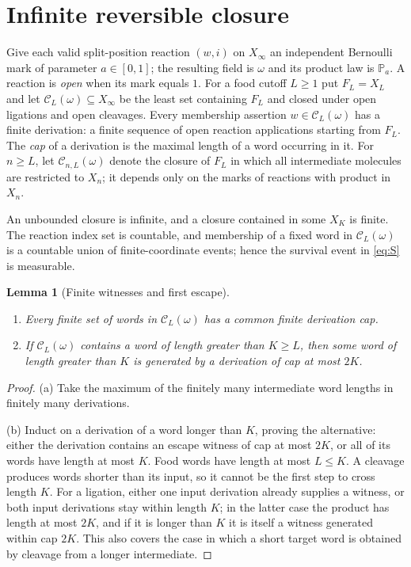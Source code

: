 \documentclass[11pt,reqno]{amsart}
\theoremstyle{plain}
\newtheorem{lemma}[theorem]{Lemma}
\theoremstyle{definition}
\theoremstyle{remark}
\numberwithin{equation}{section}
\newcommand{\Prob}{\mathbb{P}}
\newcommand{\cC}{\mathcal{C}}
\newcommand{\Xinf}{X_\infty}
\begin{document}
\section{Infinite reversible closure}\label{sec:infinite}

Give each valid split-position reaction $(w,i)$ on $\Xinf$ an independent Bernoulli mark of parameter $a\in[0,1]$; the resulting field is $\omega$ and its product law is $\Prob_a$. A reaction is \emph{open} when its mark equals $1$. For a food cutoff $L\ge1$ put $F_L=X_L$ and let $\cC_L(\omega)\subseteq\Xinf$ be the least set containing $F_L$ and closed under open ligations and open cleavages. Every membership assertion $w\in\cC_L(\omega)$ has a finite derivation: a finite sequence of open reaction applications starting from $F_L$. The \emph{cap} of a derivation is the maximal length of a word occurring in it. For $n\ge L$, let $\cC_{n,L}(\omega)$ denote the closure of $F_L$ in which all intermediate molecules are restricted to $X_n$; it depends only on the marks of reactions with product in $X_n$.

An unbounded closure is infinite, and a closure contained in some $X_K$ is finite. The reaction index set is countable, and membership of a fixed word in $\cC_L(\omega)$ is a countable union of finite-coordinate events; hence the survival event in \eqref{eq:S} is measurable.

\begin{lemma}[Finite witnesses and first escape]\label{lem:witness}
\leavevmode
\begin{enumerate}[label=(\alph*)]
\item Every finite set of words in $\cC_L(\omega)$ has a common finite derivation cap.
\item If $\cC_L(\omega)$ contains a word of length greater than $K\ge L$, then some word of length greater than $K$ is generated by a derivation of cap at most $2K$.
\end{enumerate}
\end{lemma}

\begin{proof}
(a) Take the maximum of the finitely many intermediate word lengths in finitely many derivations.

(b) Induct on a derivation of a word longer than $K$, proving the alternative: either the derivation contains an escape witness of cap at most $2K$, or all of its words have length at most $K$. Food words have length at most $L\le K$. A cleavage produces words shorter than its input, so it cannot be the first step to cross length $K$. For a ligation, either one input derivation already supplies a witness, or both input derivations stay within length $K$; in the latter case the product has length at most $2K$, and if it is longer than $K$ it is itself a witness generated within cap $2K$. This also covers the case in which a short target word is obtained by cleavage from a longer intermediate.
\end{proof}
\end{document}
